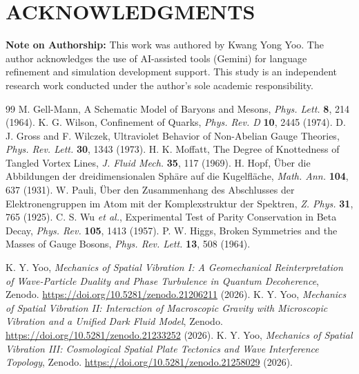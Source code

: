 \documentclass[reprint,amsmath,amssymb,aps,prd]{revtex4-2}
\begin{document}
\vspace{1em}
\section*{ACKNOWLEDGMENTS}
\textbf{Note on Authorship:} This work was authored by Kwang Yong Yoo. The author acknowledges the use of AI-assisted tools (Gemini) for language refinement and simulation development support. This study is an independent research work conducted under the author's sole academic responsibility.

\begin{thebibliography}{99}
 M. Gell-Mann, A Schematic Model of Baryons and Mesons, \textit{Phys. Lett.} \textbf{8}, 214 (1964).
 K. G. Wilson, Confinement of Quarks, \textit{Phys. Rev. D} \textbf{10}, 2445 (1974).
 D. J. Gross and F. Wilczek, Ultraviolet Behavior of Non-Abelian Gauge Theories, \textit{Phys. Rev. Lett.} \textbf{30}, 1343 (1973).
 H. K. Moffatt, The Degree of Knottedness of Tangled Vortex Lines, \textit{J. Fluid Mech.} \textbf{35}, 117 (1969).
 H. Hopf, \"{U}ber die Abbildungen der dreidimensionalen Sph\"{a}re auf die Kugelfl\"{a}che, \textit{Math. Ann.} \textbf{104}, 637 (1931).
 W. Pauli, \"{U}ber den Zusammenhang des Abschlusses der Elektronengruppen im Atom mit der Komplexstruktur der Spektren, \textit{Z. Phys.} \textbf{31}, 765 (1925).
 C. S. Wu \textit{et al.}, Experimental Test of Parity Conservation in Beta Decay, \textit{Phys. Rev.} \textbf{105}, 1413 (1957).
 P. W. Higgs, Broken Symmetries and the Masses of Gauge Bosons, \textit{Phys. Rev. Lett.} \textbf{13}, 508 (1964).

 K. Y. Yoo, \textit{Mechanics of Spatial Vibration I: A Geomechanical Reinterpretation of Wave-Particle Duality and Phase Turbulence in Quantum Decoherence}, Zenodo. \url{https://doi.org/10.5281/zenodo.21206211} (2026).
 K. Y. Yoo, \textit{Mechanics of Spatial Vibration II: Interaction of Macroscopic Gravity with Microscopic Vibration and a Unified Dark Fluid Model}, Zenodo. \url{https://doi.org/10.5281/zenodo.21233252} (2026).
 K. Y. Yoo, \textit{Mechanics of Spatial Vibration III: Cosmological Spatial Plate Tectonics and Wave Interference Topology}, Zenodo. \url{https://doi.org/10.5281/zenodo.21258029} (2026).
\end{thebibliography}
\end{document}
